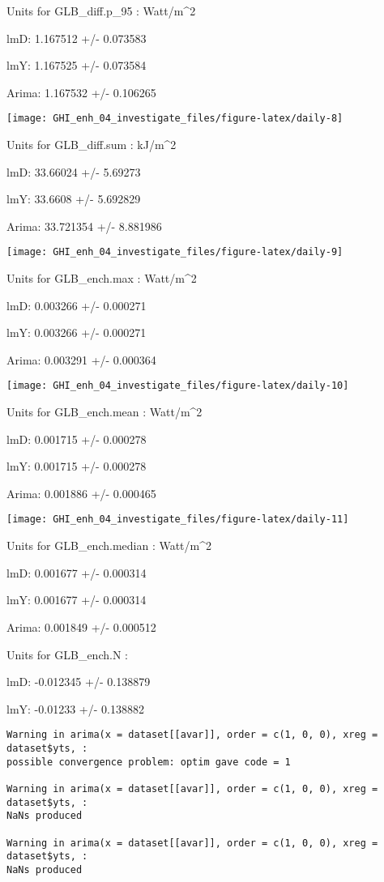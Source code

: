 \documentclass[
  10pt,
  a4paper,oneside]{article}
\begin{document}
Units for GLB\_diff.p\_95 : Watt/m\^{}2

lmD: 1.167512 +/- 0.073583

lmY: 1.167525 +/- 0.073584

Arima: 1.167532 +/- 0.106265

\begin{center}\texttt{[image: GHI\_enh\_04\_investigate\_files/figure-latex/daily-8]} \end{center}

Units for GLB\_diff.sum : kJ/m\^{}2

lmD: 33.66024 +/- 5.69273

lmY: 33.6608 +/- 5.692829

Arima: 33.721354 +/- 8.881986

\begin{center}\texttt{[image: GHI\_enh\_04\_investigate\_files/figure-latex/daily-9]} \end{center}

Units for GLB\_ench.max : Watt/m\^{}2

lmD: 0.003266 +/- 0.000271

lmY: 0.003266 +/- 0.000271

Arima: 0.003291 +/- 0.000364

\begin{center}\texttt{[image: GHI\_enh\_04\_investigate\_files/figure-latex/daily-10]} \end{center}

Units for GLB\_ench.mean : Watt/m\^{}2

lmD: 0.001715 +/- 0.000278

lmY: 0.001715 +/- 0.000278

Arima: 0.001886 +/- 0.000465

\begin{center}\texttt{[image: GHI\_enh\_04\_investigate\_files/figure-latex/daily-11]} \end{center}

Units for GLB\_ench.median : Watt/m\^{}2

lmD: 0.001677 +/- 0.000314

lmY: 0.001677 +/- 0.000314

Arima: 0.001849 +/- 0.000512

Units for GLB\_ench.N :

lmD: -0.012345 +/- 0.138879

lmY: -0.01233 +/- 0.138882

\begin{verbatim}
Warning in arima(x = dataset[[avar]], order = c(1, 0, 0), xreg = dataset$yts, :
possible convergence problem: optim gave code = 1

Warning in arima(x = dataset[[avar]], order = c(1, 0, 0), xreg = dataset$yts, :
NaNs produced

Warning in arima(x = dataset[[avar]], order = c(1, 0, 0), xreg = dataset$yts, :
NaNs produced
\end{verbatim}
\end{document}
